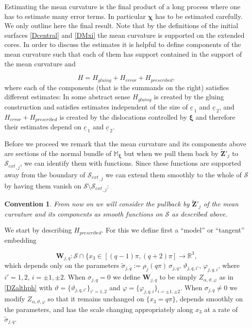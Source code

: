 \documentclass[12pt,namelimits,sumlimits]{amsart}
\newtheorem{convention}[theorem]{Convention}
\theoremstyle{remark}
\numberwithin{equation}{section}
\begin{document}
Estimating the mean curvature is the final product of a long process
where one has to estimate many error terms.
In particular ${\boldsymbol{\chi}}$ has to be estimated carefully.
We only outline here the final result.
Note that by the definitions of the initial surfaces \ref{Dcentral}
and \ref{DMxi} the mean curvature is supported on the extended cores.
In order to discuss the estimates it is helpful to define components of the mean
curvature such that
each of them has support contained in the support of the mean curvature and
\addtocounter{theorem}{1}
\begin{equation}
\label{EHparts}
H = {{H_{gluing}}}+{{H_{error}}}+{{H_{prescribed}}},
\end{equation}
where each of the components (that is the summands on the right)
satisfies different estimates:
In some abstract sense ${{H_{gluing}}}$ is created by the gluing construction
and satisfies estimates independent of the size of ${\underline{c}\,}_1$ and ${\underline{c}\,}_2$,
and ${{H_{error}}}+{{H_{prescribed}}}$ is created by the dislocations controlled by ${{\boldsymbol{\xi}}}$
and therefore their estimates depend on ${\underline{c}\,}_1$ and ${\underline{c}\,}_2$.

Before we proceed we remark that the mean curvature and its components above are sections of the normal bundle
of ${\mathbb{M}}_{{\boldsymbol{\xi}}}$ but when we pull them back by 
${\widetilde{\boldsymbol{Z}}}'_j$
to ${{\mathcal{S}_{ext}}}_{,j}$, 
we can identify them with functions.
Since these functions are supported away from the boundary of ${{\mathcal{S}_{ext}}}_{,j}$
we can extend them smoothly to the whole of ${{\mathcal{S}}}$ by having them vanish on ${{\mathcal{S}}}\setminus{{\mathcal{S}_{ext}}}_{,j}$:

\addtocounter{equation}{1}
\begin{convention}
\label{CHfunction}
From now on we will consider the pullback by ${\widetilde{\boldsymbol{Z}}}'_j$ of the mean curvature and its components
as smooth functions on ${{\mathcal{S}}}$ as described above.
\end{convention}

We start by describing ${{H_{prescribed}}}$.
For this we define first a ``model'' or ``tangent'' embedding 
\addtocounter{theorem}{1}
\begin{equation}
\label{EWjq}
{\boldsymbol{W}}_{j,q}:{{\mathcal{S}}}\cap\{x_3\in[(q-1)\pi,(q+2)\pi]\to{{{\mathbb{R}}^3}},
\end{equation}
which depends only on the parameters
$\widetilde{\sigma}_{{j,q}}:= \rho_j(q\pi)\, \sigma_{j,q},\, \vartheta_{j,q,i'},\, \varphi_{j,q,i}$,
where $i'=1,2$, ${{i=\pm1,\pm2}}$.
When $\sigma_{j,q}=0$
we define
${\boldsymbol{W}}_{j,q}$ to be simply $Z_{{\alpha,\vartheta,\varphi}}$ as in \ref{DZalthph}
with $\vartheta=\{\vartheta_{j,q,i'}\}_{i'=1,2}$
and $\varphi=\{\varphi_{j,q,i}\}_{{i=\pm1,\pm2}}$.
When $\sigma_{j,q}\ne0$ we modify $Z_{{\alpha,\vartheta,\varphi}}$ so that it 
remains unchanged on $\{x_3=q\pi\}$, depends smoothly on the parameters,
and has the scale changing appropriately along $x_3$ at a rate of $\widetilde{\sigma}_{{j,q}}$.
\end{document}
